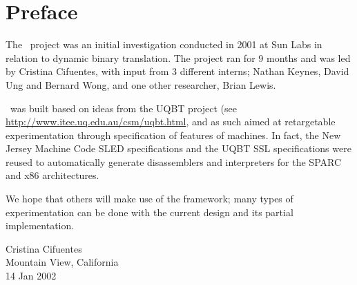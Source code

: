 \chapter*{Preface}

The \walk\ project was an initial investigation conducted
in 2001 at Sun Labs in relation to dynamic binary translation. 
The project ran for 9 months and was led by Cristina Cifuentes, 
with input from 3 different interns; Nathan Keynes, David Ung
and Bernard Wong, and one other researcher, Brian Lewis. 

\walk\ was built based on ideas from the UQBT project (see 
\url{http://www.itee.uq.edu.au/csm/uqbt.html}, and as such 
aimed at retargetable experimentation through specification of 
features of machines.  In fact, the New Jersey Machine Code 
SLED specifications and the UQBT SSL specifications were reused
to automatically generate disassemblers and interpreters for the 
SPARC and x86 architectures.   

We hope that others will make use of the framework; many types
of experimentation can be done with the current design and 
its partial implementation. 


{\small
\begin{flushright}
Cristina Cifuentes \\
Mountain View, California \\
14 Jan 2002
\end{flushright}
}


